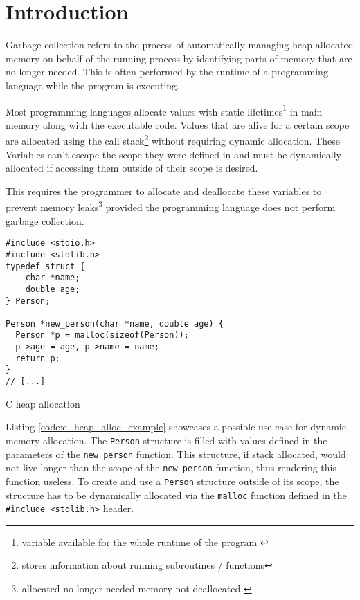 \section{Introduction}
\label{sec:introduction}

Garbage collection refers to the process of automatically managing heap
allocated memory on behalf of the running process by identifying parts of
memory that are no longer needed. This is often performed by the runtime of a
programming language while the program is executing.
\cite[Introduction]{go_gcguide_2022} \cite[Introduction]{go_spec_2023} 

Most programming languages allocate values with static
lifetimes\footnote{variable available for the whole runtime of the program
\cite[Abstract]{static-dynamic-scope_tanter_2009}} in main memory along with
the executable code. Values that are alive for a certain scope are allocated
using the call stack\footnote{stores information about running subroutines /
functions\cite[2.2 Call Stacks]{call-stack_mcmaster-memon_2006}} without
requiring dynamic allocation. These Variables can't escape the scope they were
defined in and must be dynamically allocated if accessing them outside of
their scope is desired.

This requires the programmer to allocate and deallocate these
variables to prevent memory leaks\footnote{allocated no longer needed memory
not deallocated \cite[1.2.1 A Practical Object Ownership
Model]{practical_heine-lam_2003}} provided the programming language does not
perform garbage collection. 

\begin{listing}[H] 
    \begin{verbatim} 
#include <stdio.h>
#include <stdlib.h>
typedef struct { 
    char *name;
    double age; 
} Person;

Person *new_person(char *name, double age) {
  Person *p = malloc(sizeof(Person));
  p->age = age, p->name = name;
  return p;
}
// [...]
    \end{verbatim}
    \caption{C heap allocation}
    \label{code:c_heap_alloc_example}
\end{listing}

Listing \autoref{code:c_heap_alloc_example} showcases a possible use case for
dynamic memory allocation. The \texttt{Person} structure is filled with values
defined in the parameters of the \texttt{new\_person} function. This structure,
if stack allocated, would not live longer than the scope of the
\texttt{new\_person} function, thus rendering this function useless. To create
and use a \texttt{Person} structure outside of its scope, the structure has to
be dynamically allocated via the \texttt{malloc} function defined in the
\texttt{#include <stdlib.h>} header.

